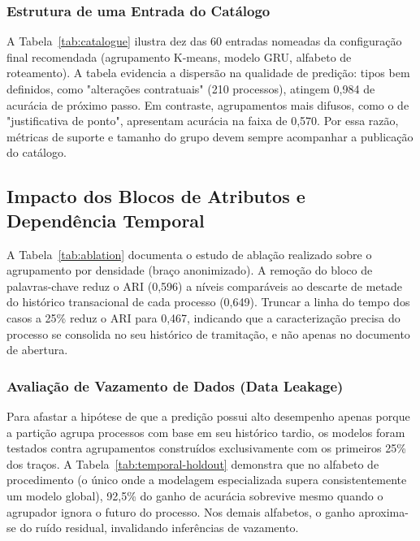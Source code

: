 

\subsubsection{Estrutura de uma Entrada do Catálogo}\label{sec:res-entrada}

A Tabela~\ref{tab:catalogue} ilustra dez das 60 entradas nomeadas da configuração final recomendada (agrupamento K-means, modelo GRU, alfabeto de roteamento). A tabela evidencia a dispersão na qualidade de predição: tipos bem definidos, como "alterações contratuais" (210 processos), atingem 0,984 de acurácia de próximo passo. Em contraste, agrupamentos mais difusos, como o de "justificativa de ponto", apresentam acurácia na faixa de 0,570. Por essa razão, métricas de suporte e tamanho do grupo devem sempre acompanhar a publicação do catálogo.



\subsection{Impacto dos Blocos de Atributos e Dependência Temporal}\label{sec:res-blocos}

A Tabela~\ref{tab:ablation} documenta o estudo de ablação realizado sobre o agrupamento por densidade (braço anonimizado). A remoção do bloco de palavras-chave reduz o ARI (0,596) a níveis comparáveis ao descarte de metade do histórico transacional de cada processo (0,649). Truncar a linha do tempo dos casos a 25\% reduz o ARI para 0,467, indicando que a caracterização precisa do processo se consolida no seu histórico de tramitação, e não apenas no documento de abertura.



\subsubsection{Avaliação de Vazamento de Dados (Data Leakage)}\label{sec:res-holdout}

Para afastar a hipótese de que a predição possui alto desempenho apenas porque a partição agrupa processos com base em seu histórico tardio, os modelos foram testados contra agrupamentos construídos exclusivamente com os primeiros 25\% dos traços. A Tabela~\ref{tab:temporal-holdout} demonstra que no alfabeto de procedimento (o único onde a modelagem especializada supera consistentemente um modelo global), 92,5\% do ganho de acurácia sobrevive mesmo quando o agrupador ignora o futuro do processo. Nos demais alfabetos, o ganho aproxima-se do ruído residual, invalidando inferências de vazamento.

